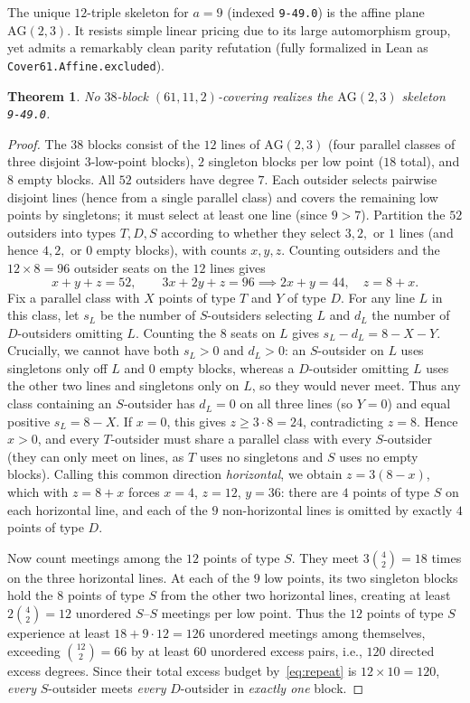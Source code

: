 \documentclass[11pt,a4paper]{article}
\newtheorem{theorem}{Theorem}[section]
\theoremstyle{definition}
\theoremstyle{remark}
\newcommand{\AG}{\mathrm{AG}}
\begin{document}
The unique $12$-triple skeleton for $a = 9$ (indexed \texttt{9-49.0}) is the affine plane $\AG(2,3)$. It resists simple linear pricing due to its large automorphism group, yet admits a remarkably clean parity refutation (fully formalized in Lean as \texttt{Cover61.Affine.excluded}).

\begin{theorem}\label{thm:affine}
No $38$-block $(61,11,2)$-covering realizes the $\AG(2,3)$ skeleton \texttt{9-49.0}.
\end{theorem}

\begin{proof}
The $38$ blocks consist of the $12$ lines of $\AG(2,3)$ (four parallel classes of three disjoint $3$-low-point blocks), $2$ singleton blocks per low point ($18$ total), and $8$ empty blocks. All $52$ outsiders have degree $7$. Each outsider selects pairwise disjoint lines (hence from a single parallel class) and covers the remaining low points by singletons; it must select at least one line (since $9 > 7$). Partition the $52$ outsiders into types $T, D, S$ according to whether they select $3, 2,$ or $1$ lines (and hence $4, 2,$ or $0$ empty blocks), with counts $x, y, z$. Counting outsiders and the $12 \times 8 = 96$ outsider seats on the $12$ lines gives
\[
  x + y + z = 52, \qquad 3x + 2y + z = 96 \implies 2x + y = 44,\quad z = 8 + x.
\]
Fix a parallel class with $X$ points of type $T$ and $Y$ of type $D$. For any line $L$ in this class, let $s_L$ be the number of $S$-outsiders selecting $L$ and $d_L$ the number of $D$-outsiders omitting $L$. Counting the $8$ seats on $L$ gives $s_L - d_L = 8 - X - Y$. Crucially, we cannot have both $s_L > 0$ and $d_L > 0$: an $S$-outsider on $L$ uses singletons only off $L$ and $0$ empty blocks, whereas a $D$-outsider omitting $L$ uses the other two lines and singletons only on $L$, so they would never meet. Thus any class containing an $S$-outsider has $d_L = 0$ on all three lines (so $Y = 0$) and equal positive $s_L = 8 - X$. If $x = 0$, this gives $z \ge 3 \cdot 8 = 24$, contradicting $z = 8$. Hence $x > 0$, and every $T$-outsider must share a parallel class with every $S$-outsider (they can only meet on lines, as $T$ uses no singletons and $S$ uses no empty blocks). Calling this common direction \emph{horizontal}, we obtain $z = 3(8 - x)$, which with $z = 8 + x$ forces $x = 4$, $z = 12$, $y = 36$: there are $4$ points of type $S$ on each horizontal line, and each of the $9$ non-horizontal lines is omitted by exactly $4$ points of type $D$.

Now count meetings among the $12$ points of type $S$. They meet $3\binom{4}{2} = 18$ times on the three horizontal lines. At each of the $9$ low points, its two singleton blocks hold the $8$ points of type $S$ from the other two horizontal lines, creating at least $2\binom{4}{2} = 12$ unordered $S$--$S$ meetings per low point. Thus the $12$ points of type $S$ experience at least $18 + 9 \cdot 12 = 126$ unordered meetings among themselves, exceeding $\binom{12}{2} = 66$ by at least $60$ unordered excess pairs, i.e., $120$ directed excess degrees. Since their total excess budget by~\eqref{eq:repeat} is $12 \times 10 = 120$, \emph{every} $S$-outsider meets \emph{every} $D$-outsider in \emph{exactly one} block.


\end{proof}
\end{document}
